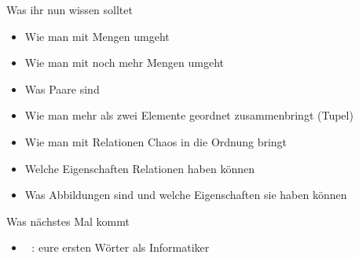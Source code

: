 \begin{frame}
	\begin{block}{Was ihr nun wissen solltet}
		\begin{itemize}
			\item Wie man mit Mengen umgeht
			\item Wie man mit noch mehr Mengen umgeht
			\item Was Paare sind
			\item Wie man mehr als zwei Elemente geordnet zusammenbringt (Tupel)
			\item Wie man mit Relationen Chaos in die Ordnung bringt
			\item Welche Eigenschaften Relationen haben können
			\item Was Abbildungen sind und welche Eigenschaften sie haben können
		\end{itemize}
	\end{block}
	\begin{block}{Was nächstes Mal kommt}
		\begin{itemize}
			\item \textcolor{white}{.}\!%
				  : eure ersten Wörter als Informatiker 
		\end{itemize}
	\end{block}
\end{frame}







\backupend


